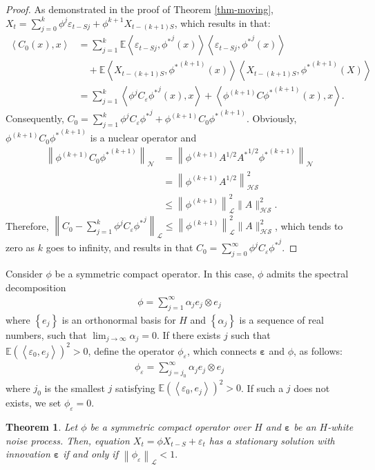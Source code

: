 \documentclass[11pt,a4paper]{article}
\newtheorem{Theorem} {Theorem}[section]
\numberwithin{equation}{section}
\newcommand{\E}{\mathbb{E}}
\begin{document}
\begin{proof}
  As demonstrated in the proof of Theorem \ref{thm-moving}, $X_t=\sum_{j=0}^{k}\phi^j \varepsilon_{t-Sj}+\phi^{k+1} X_{t-\left(k+1\right)S}$, which results in that:
  \begin{align*}
    \left\langle C_0(x),x\right\rangle
      & = \sum_{j=1}^k \E\left\langle\varepsilon_{t-Sj},{\phi^*}^j(x)\right\rangle\left\langle\varepsilon_{t-Sj},{\phi^*}^j(x)\right\rangle \\
      & \quad+ \E\left\langle X_{t-\left(k+1\right)S},{\phi^*}^{(k+1)}(x)\right\rangle\left\langle X_{t-\left(k+1\right)S},{\phi^*}^{(k+1)}(X)\right\rangle \\
      & = \sum_{j=1}^k \left\langle {\phi}^j C_{\varepsilon}{\phi^*}^j(x),x\right\rangle+\left\langle {\phi}^{(k+1)}C{\phi^*}^{(k+1)}(x),x\right\rangle.
  \end{align*}
  Consequently, $C_0=\sum_{j=1}^k {\phi}^j C_{\varepsilon}{\phi^*}^j+{\phi}^{(k+1)}C_0{\phi^*}^{(k+1)}$. Obviously, ${\phi}^{(k+1)}C_0{\phi^*}^{(k+1)}$ is a nuclear operator and
  \begin{align*}
    \left\|{\phi}^{(k+1)}C_0{\phi^*}^{(k+1)}\right\|_{\mathcal{N}}
      & = \left\|{\phi}^{(k+1)}A^{1/2}{A^*}^{1/2}{\phi^*}^{(k+1)}\right\|_{\mathcal{N}} \\
      & = \left\|{\phi}^{(k+1)}A^{1/2}\right\|^2_{\mathcal{HS}} \\
      & \leq \left\|\phi^{(k+1)}\right\|_\mathcal{L}^2\|A\|_{\mathcal{HS}}^2.
  \end{align*}
  Therefore, $\left\|C_0-\sum_{j=1}^k {\phi}^j C_{\varepsilon}{\phi^*}^j\right\|_\mathcal{L}\leq\left\|\phi^{(k+1)}\right\|_\mathcal{L}^2\|A\|_{\mathcal{HS}}^2$, which tends to zero as $k$ goes to infinity, and results in that $C_0=\sum_{j=0}^\infty\phi^j C_{\varepsilon}{\phi^*}^j.$
\end{proof}
Consider $\phi$ be a symmetric compact operator. In this case, $\phi$ admits the spectral decomposition
\begin{align}
  \phi=\sum_{j=1}^\infty \alpha_j e_j\otimes e_j
\end{align}
where $\left\{e_j\right\}$ is an orthonormal basis for $H$ and $\left\{\alpha_j\right\}$ is a sequence of real numbers, such that $\lim_{j\rightarrow\infty}\alpha_j=0.$ If there exists $j$ such that $\E\left(\left\langle \varepsilon_0,e_j\right\rangle\right)^2>0$,  define the operator $\phi_\varepsilon$, which connects $\bm{\varepsilon}$ and $\phi$, as follows:
\begin{align}
  \phi_\varepsilon=\sum_{j=j_0}^\infty \alpha_j e_j\otimes e_j
\end{align}
where $j_0$ is the smallest $j$ satisfying $\E\left(\left\langle
\varepsilon_0,e_j\right\rangle\right)^2>0$.  If such a $j$ does not
exists, we set $\phi_\varepsilon=0.$
\begin{Theorem}
  Let $\phi$ be a symmetric compact operator over $H$ and $\bm{\varepsilon}$ be an $H$-white noise process.     Then, equation $X_t=\phi X_{t-S}+\varepsilon_t$ has a stationary solution with innovation $\bm{\varepsilon}$ if and only if $\left\|\phi_{\varepsilon}\right\|_\mathcal{L}<1.$
\end{Theorem}
\end{document}
